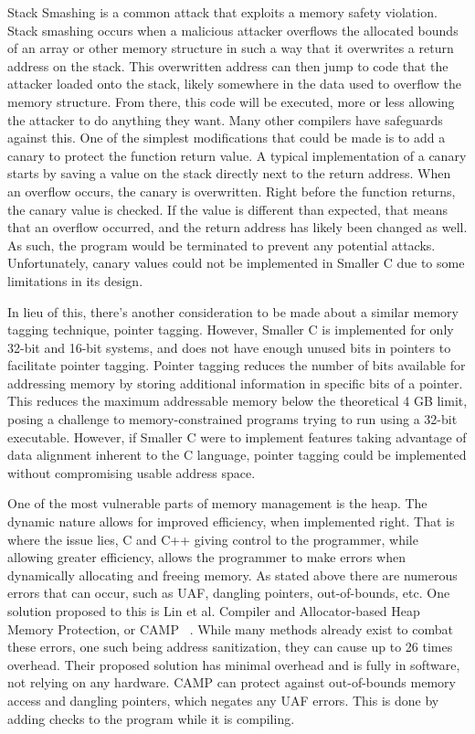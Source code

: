 \documentclass[sigconf, anonymous]{acmart}
\begin{document}
Stack Smashing is a common attack that exploits a memory safety violation. Stack smashing occurs when a malicious attacker overflows the allocated bounds of an array or other memory structure in such a way that it overwrites a return address on the stack. This overwritten address can then jump to code that the attacker loaded onto the stack, likely somewhere in the data used to overflow the memory structure. From there, this code will be executed, more or less allowing the attacker to do anything they want. Many other compilers have safeguards against this. One of the simplest modifications that could be made is to add a canary to protect the function return value. A typical implementation of a canary starts by saving a value on the stack directly next to the return address. When an overflow occurs, the canary is overwritten. Right before the function returns, the canary value is checked. If the value is different than expected, that means that an overflow occurred, and the return address has likely been changed as well. As such, the program would be terminated to prevent any potential attacks. Unfortunately, canary values could not be implemented in Smaller C due to some limitations in its design.

In lieu of this, there’s another consideration to be made about a similar memory tagging technique, pointer tagging. However, Smaller C is implemented for only 32-bit and 16-bit systems, and does not have enough unused bits in pointers to facilitate pointer tagging. Pointer tagging reduces the number of bits available for addressing memory by storing additional information in specific bits of a pointer. This reduces the maximum addressable memory below the theoretical 4 GB limit, posing a challenge to memory-constrained programs trying to run using a 32-bit executable. However, if Smaller C were to implement features taking advantage of data alignment inherent to the C language, pointer tagging could be implemented without compromising usable address space.

One of the most vulnerable parts of memory management is the heap. The dynamic nature allows for improved efficiency, when implemented right. That is where the issue lies, C and C++ giving control to the programmer, while allowing greater efficiency, allows the programmer to make errors when dynamically allocating and freeing memory. As stated above there are numerous errors that can occur, such as UAF, dangling pointers, out-of-bounds, etc. One solution proposed to this is Lin et al. Compiler and Allocator-based Heap Memory Protection, or CAMP ~\cite{Lin:CAMP}. While many methods already exist to combat these errors, one such being address sanitization, they can cause up to 26 times overhead. Their proposed solution has minimal overhead and is fully in software, not relying on any hardware. CAMP can protect against out-of-bounds memory access and dangling pointers, which negates any UAF errors. This is done by adding checks to the program while it is compiling.
\end{document}
